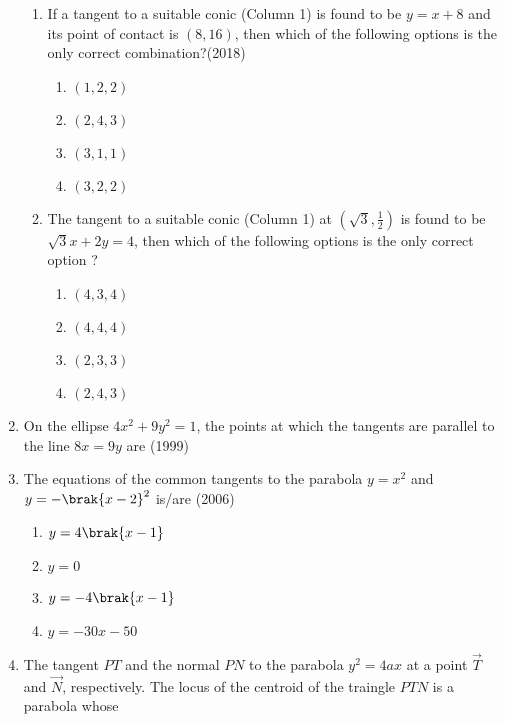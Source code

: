 \begin{enumerate}[label=\thesubsection.\arabic*.,ref=\thesubsection.\theenumi]
\begin{enumerate}
\item If a tangent to a suitable conic (Column 1) is found to be $y = x + 8$ and its point of contact is $(8, 16)$, then which of the following
options is the only correct combination?\hfill {(2018)}
%
\begin{multicols}{4}
\begin{enumerate}
    \item $(1,2,2)$
    \item $(2,4,3)$
    \item $(3,1,1)$
    \item $(3,2,2)$
\end{enumerate}
\end{multicols}
%
\item  The tangent to a suitable conic (Column 1) at $(\sqrt{3},\frac{1}{2})$ is found to be $\sqrt{3}x + 2y = 4$, then which of the following options is the only correct option ? 
%
\begin{multicols}{4}
\begin{enumerate}
    \item $(4,3,4)$
    \item $(4,4,4)$
    \item $(2,3,3)$
    \item $(2,4,3)$
\end{enumerate}
\end{multicols}
\end{enumerate}
\item On the ellipse $4x^2+9y^2=1$, the points at which the tangents are parallel to the line $8x=9y$ are \hfill(1999)
	\begin{multicols}{2}
\begin{enumerate}
	\end{enumerate}
\end{multicols}
%
\item The equations of the common tangents to the parabola $y=x^2$ and $y=-\brak{x-2}^2$ is/are \hfill(2006)\\
	\begin{multicols}{4}
\begin{enumerate}
		\item $y=4\brak{x-1}$
		\item $y=0$
		\item $y=-4\brak{x-1}$
		\item $y=-30x-50$
	\end{enumerate}
\end{multicols}
	\item The tangent ${PT}$ and the normal ${PN}$ to the parabola $y^2=4ax$ at a point $\vec{T}$ and $\vec{N}$, respectively. The locus of the centroid of the traingle ${PTN}$ is a parabola whose


\end{enumerate}

